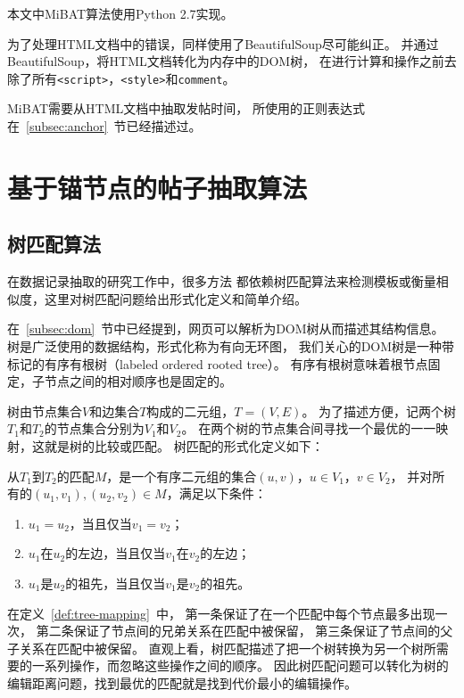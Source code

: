 本文中MiBAT算法使用Python 2.7实现。

为了处理HTML文档中的错误，同样使用了BeautifulSoup尽可能纠正。
并通过BeautifulSoup，将HTML文档转化为内存中的DOM树，
在进行计算和操作之前去除了所有\texttt{<script>}，\texttt{<style>}和\texttt{comment}。

MiBAT需要从HTML文档中抽取发帖时间，
所使用的正则表达式在~\ref{subsec:anchor}~节已经描述过。

\section{基于锚节点的帖子抽取算法}
\label{sec:pean-method}

\subsection{树匹配算法}
\label{subsec:tree-match}

在数据记录抽取的研究工作中，很多方法
都依赖树匹配算法来检测模板或衡量相似度，这里对树匹配问题给出形式化定义和简单介绍。

在~\ref{subsec:dom}~节中已经提到，网页可以解析为DOM树从而描述其结构信息。
树是广泛使用的数据结构，形式化称为有向无环图，
我们关心的DOM树是一种带标记的有序有根树（labeled ordered rooted tree）。
有序有根树意味着根节点固定，子节点之间的相对顺序也是固定的。

树由节点集合$V$和边集合$T$构成的二元组，$T=(V,E)$。
为了描述方便，记两个树$T_1$和$T_2$的节点集合分别为$V_1$和$V_2$。
在两个树的节点集合间寻找一个最优的一一映射，这就是树的比较或匹配。
树匹配的形式化定义如下：

\begin{definition}
\label{def:tree-mapping}
从$T_1$到$T_2$的匹配$M$，是一个有序二元组的集合$(u,v)$，$u \in V_1$，$v \in V_2$，
并对所有的$(u_1,v_1), (u_2,v_2) \in M$，满足以下条件：
\begin{enumerate}
\item $u_1 = u_2$，当且仅当$v_1 = v_2$；
\item $u_1$在$u_2$的左边，当且仅当$v_1$在$v_2$的左边；
\item $u_1$是$u_2$的祖先，当且仅当$v_1$是$v_2$的祖先。
\end{enumerate}
\end{definition}

在定义~\ref{def:tree-mapping}~中，
第一条保证了在一个匹配中每个节点最多出现一次，
第二条保证了节点间的兄弟关系在匹配中被保留，
第三条保证了节点间的父子关系在匹配中被保留。
直观上看，树匹配描述了把一个树转换为另一个树所需要的一系列操作，而忽略这些操作之间的顺序。
因此树匹配问题可以转化为树的编辑距离问题，找到最优的匹配就是找到代价最小的编辑操作。

